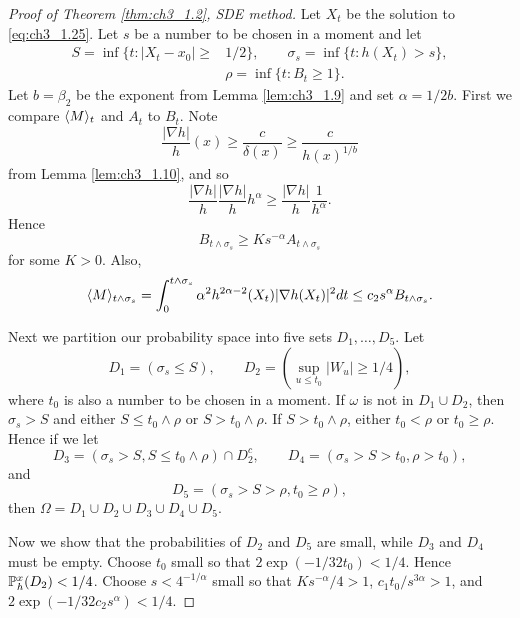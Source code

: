 \begin{proof}[Proof of Theorem \ref{thm:ch3_1.2}, SDE method]
Let $X_t$ be the solution to \eqref{eq:ch3_1.25}. Let $s$ be a number to be chosen in a moment and let
\begin{align*}
    S = \inf\{t : |X_t - x_0| \geq &1/2\}, \qquad \sigma_s = \inf\{t : h(X_t) > s\}, \\
    &\rho = \inf\{t : B_t \geq 1\}.
\end{align*}
Let $b = \beta_2$ be the exponent from Lemma \ref{lem:ch3_1.9} and set $\alpha = 1/2b$. First we compare $\lrang{M}_t$ and $A_t$ to $B_t$. Note
\begin{equation}\label{eq:ch3_1.27}
    \frac{|\nabla h|}{h}(x) \geq \frac{c}{\delta(x)} \geq \frac{c}{h(x)^{1/b}}
\end{equation}
from Lemma \ref{lem:ch3_1.10}, and so
\begin{equation}\label{eq:ch3_1.28}
    \frac{|\nabla h|}{h}\frac{|\nabla h|}{h}h^\alpha \geq \frac{|\nabla h|}{h}\frac{1}{h^\alpha}.
\end{equation}
Hence
\begin{equation}\label{eq:ch3_1.29}
    B_{t\wedge\sigma_s} \geq Ks^{-\alpha}A_{t\wedge\sigma_s}
\end{equation}
\mnewpage
for some $K > 0$. Also,
\begin{equation}\label{eq:ch3_1.30}
    \lrang{M}   _{t\wedge\sigma_s} = \int_0^{t\wedge\sigma_s} \alpha^2h^{2\alpha-2}(X_t)|\nabla h(X_t)|^2 dt \leq c_2s^\alpha B_{t\wedge\sigma_s}.
\end{equation}

Next we partition our probability space into five sets $D_1,\ldots,D_5$. Let
\[
    D_1 = (\sigma_s \leq S), \qquad D_2 = (\sup_{u\leq t_0} |W_u| \geq 1/4),
\]
where $t_0$ is also a number to be chosen in a moment. If $\omega$ is not in $D_1 \cup D_2$, then $\sigma_s > S$ and either $S \leq t_0 \wedge \rho$ or $S > t_0 \wedge \rho$. If $S > t_0 \wedge \rho$, either $t_0 < \rho$ or $t_0 \geq \rho$. Hence if we let
\[
    D_3 = (\sigma_s > S, S \leq t_0 \wedge \rho) \cap D_2^c, \qquad D_4 = (\sigma_s > S > t_0, \rho > t_0),
\]
and
\[
    D_5 = (\sigma_s > S > \rho, t_0 \geq \rho),
\]
then $\Omega = D_1 \cup D_2 \cup D_3 \cup D_4 \cup D_5$.

Now we show that the probabilities of $D_2$ and $D_5$ are small, while $D_3$ and $D_4$ must be empty. Choose $t_0$ small so that $2\exp(-1/32t_0) < 1/4$. Hence $\P_h^x(D_2) < 1/4$. Choose $s < 4^{-1/\alpha}$ small so that $Ks^{-\alpha}/4 > 1$, $c_1t_0/s^{3\alpha} > 1$, and $2\exp(-1/32c_2s^\alpha) < 1/4$.


\end{proof}
